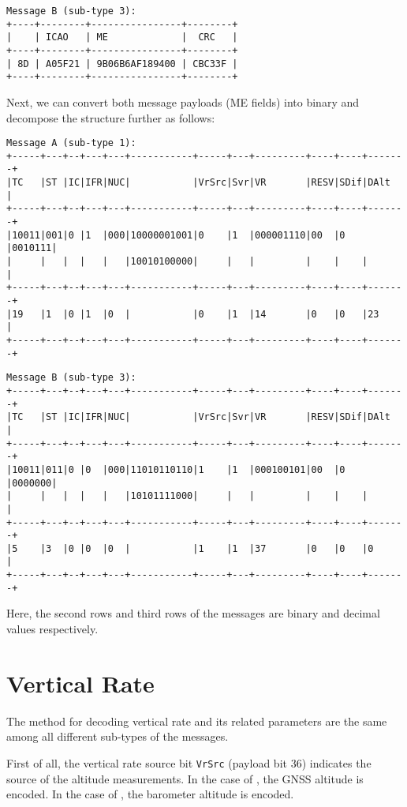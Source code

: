\begin{verbatim}
Message B (sub-type 3):
+----+--------+----------------+--------+
|    | ICAO   | ME             |  CRC   |
+----+--------+----------------+--------+
| 8D | A05F21 | 9B06B6AF189400 | CBC33F |
+----+--------+----------------+--------+
\end{verbatim}

Next, we can convert both message payloads (ME fields) into binary and decompose the structure further as follows:

\begin{verbatim}
Message A (sub-type 1):
+-----+---+--+---+---+-----------+-----+---+---------+----+----+-------+
|TC   |ST |IC|IFR|NUC|           |VrSrc|Svr|VR       |RESV|SDif|DAlt   |
+-----+---+--+---+---+-----------+-----+---+---------+----+----+-------+
|10011|001|0 |1  |000|10000001001|0    |1  |000001110|00  |0   |0010111|
|     |   |  |   |   |10010100000|     |   |         |    |    |       |
+-----+---+--+---+---+-----------+-----+---+---------+----+----+-------+
|19   |1  |0 |1  |0  |           |0    |1  |14       |0   |0   |23     |
+-----+---+--+---+---+-----------+-----+---+---------+----+----+-------+
\end{verbatim}

\begin{verbatim}
Message B (sub-type 3):
+-----+---+--+---+---+-----------+-----+---+---------+----+----+-------+
|TC   |ST |IC|IFR|NUC|           |VrSrc|Svr|VR       |RESV|SDif|DAlt   |
+-----+---+--+---+---+-----------+-----+---+---------+----+----+-------+
|10011|011|0 |0  |000|11010110110|1    |1  |000100101|00  |0   |0000000|
|     |   |  |   |   |10101111000|     |   |         |    |    |       | 
+-----+---+--+---+---+-----------+-----+---+---------+----+----+-------+
|5    |3  |0 |0  |0  |           |1    |1  |37       |0   |0   |0      |
+-----+---+--+---+---+-----------+-----+---+---------+----+----+-------+
\end{verbatim}

Here, the second rows and third rows of the messages are binary and decimal values respectively.


\section{Vertical Rate}

The method for decoding vertical rate and its related parameters are the same among all different sub-types of the messages.

First of all, the vertical rate source bit \texttt{VrSrc} (payload bit 36) indicates the source of the altitude measurements. In the case of \0, the GNSS altitude is encoded. In the case of \1, the barometer altitude is encoded.

